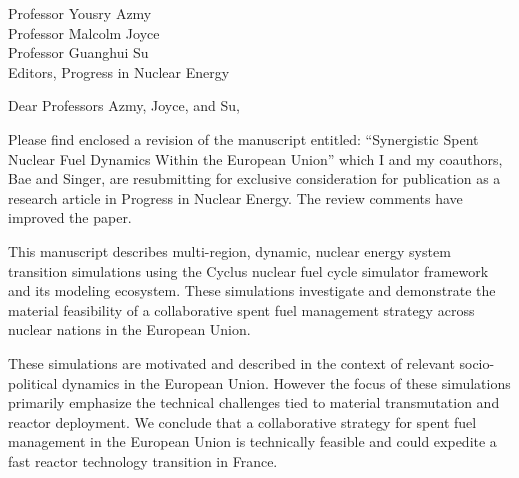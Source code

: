 \documentclass[11pt]{letter} %
\begin{document}


\begin{letter}{Professor Yousry Azmy\\
Professor Malcolm Joyce\\
Professor Guanghui Su\\
Editors, Progress in Nuclear Energy}


\address{Kathryn D. Huff\\
kdhuff@illinois.edu\\
118 Talbot Laboratory\\
MC-234\\
104 S. Wright Street\\
Urbana, IL 61801}



\opening{Dear Professors Azmy, Joyce, and Su,}

Please find enclosed a revision of the manuscript entitled: ``Synergistic Spent Nuclear Fuel 
Dynamics Within the European Union'' which I and my coauthors, Bae and Singer, 
are resubmitting for exclusive consideration for publication as a research 
article in Progress in Nuclear Energy. The review comments have improved the 
paper.

This manuscript describes multi-region, dynamic, nuclear energy system transition 
simulations using the Cyclus nuclear fuel cycle simulator framework and its 
modeling ecosystem. These simulations investigate and demonstrate the material 
feasibility of a collaborative spent fuel management strategy across nuclear 
nations in the European Union.  

These simulations are motivated and described in the context of relevant
socio-political dynamics in the European Union. However the focus of these
simulations primarily emphasize the technical challenges tied to material transmutation
and reactor deployment. We conclude that a collaborative strategy for spent 
fuel management in the European Union is technically feasible and could 
expedite a fast reactor technology transition in France.


\end{letter}
\end{document}
